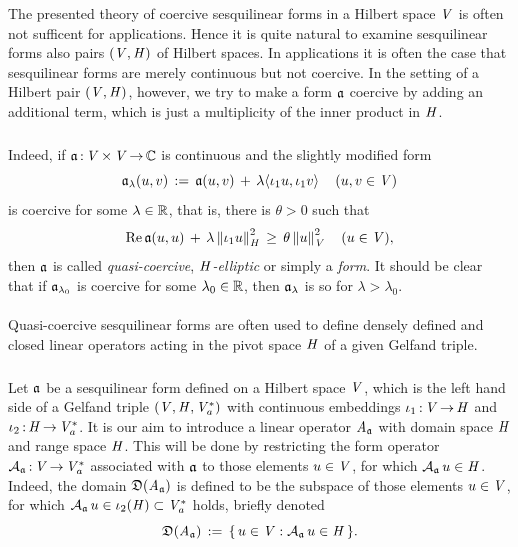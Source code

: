 \documentclass[11pt,twoside]{article}
\begin{document}
\subsubsection*{} %
The presented theory of coercive sesquilinear forms in a Hilbert space $\mathit{V}$
is often not sufficent for applications.
Hence it is quite natural to examine sesquilinear forms
also {\wrt} pairs $(\mathit{V},\mathit{H})$ of Hilbert spaces.
In applications it is often the case
that sesquilinear forms are merely continuous but not coercive.
In the setting of a Hilbert pair $(\mathit{V},\mathit{H})$,
however,
we try to make a form $\mathfrak{a}$ coercive
by adding an additional term,
which is just a multiplicity of the inner product in $\mathit{H}$.

\subparagraph*{}
Indeed,
if $\mathfrak{a}{\,:\,}\mathit{V} {\,\times\,} \mathit{V} {\,\to\,} {\mathbb{C}}$ is continuous
and the slightly modified form
\[
\mathfrak{a}_{\lambda}(u,v) \,:=\,
\mathfrak{a}(u,v) \, + \, \lambda \langle \iota_1 u,\iota_1 v \rangle\, \quad
(u,v \in \mathit{V})
\]
is coercive for some $\lambda \in {\mathbb{R}}$,
that is,
there is $\theta > 0$ such that
\begin{equation}\label{QUASI_COERCIVE}
\operatorname{Re} \mathfrak{a}(u,u)  \, + \,
\lambda \left\lVert \iota_1u \right\rVert_{\mathit{H}}^2 \, \geq \, \theta \left\lVert u \right\rVert_{\mathit{V}}^2
\quad (u \in \mathit{V}),
\end{equation}
then $\mathfrak{a}$ is called
\textit{quasi-coercive},
\textit{$\mathit{H}$-elliptic}
or simply a \textit{\GARDING} \textit{form}.
It should be clear that
if $\mathfrak{a}_{\lambda_0}$ is coercive for some $\lambda_0 \in {\mathbb{R}}$,
then $\mathfrak{a}_{\lambda}$ is so for $\lambda > \lambda_0$.

\paragraph*{} %
Quasi-coercive sesquilinear forms are often used
to define densely defined and closed linear operators
acting in the pivot space $\mathit{H}$ of a given Gelfand triple.

\subparagraph*{}
Let $\mathfrak{a}$ be a sesquilinear form defined on a Hilbert space $\mathit{V}$,
which is the left hand side of a Gelfand triple $(\mathit{V},\mathit{H},\mathit{V}_a^*)$
with continuous embeddings
$\iota_1{\,:\,}\mathit{V} {\,\to\,} \mathit{H}$ and
$\iota_2{\,:\,}\mathit{H} {\,\to\,} \mathit{V}_a^*$.
It is our aim to introduce a linear operator $\mathit{A}_{\mathfrak{a}}$
with domain space $\mathit{H}$ and range space $\mathit{H}$.
This will be done by restricting the form operator
${{\mathcal{A}}_{\mathfrak{a}}}{\,:\,}\mathit{V} {\,\to\,} \mathit{V}_a^*$ associated with $\mathfrak{a}$
to those elements $u \in \mathit{V}$,
for which ${{\mathcal{A}}_{\mathfrak{a}}} \, u \in \mathit{H}$.
Indeed,
the domain $\mathfrak{D}(\mathit{A}_{\mathfrak{a}})$ is defined to be the subspace
of those elements $u \in \mathit{V}$,
for which ${{\mathcal{A}}_{\mathfrak{a}}} \, u \in \iota_2(\mathit{H}) \subset \mathit{V}_a^*$ holds,
briefly denoted
\[
\mathfrak{D}(\mathit{A}_{\mathfrak{a}}) \,:=\, \{ \, u \in \mathit{V}: {{\mathcal{A}}_{\mathfrak{a}}} \, u \in \mathit{H} \, \}.
\]
\end{document}
